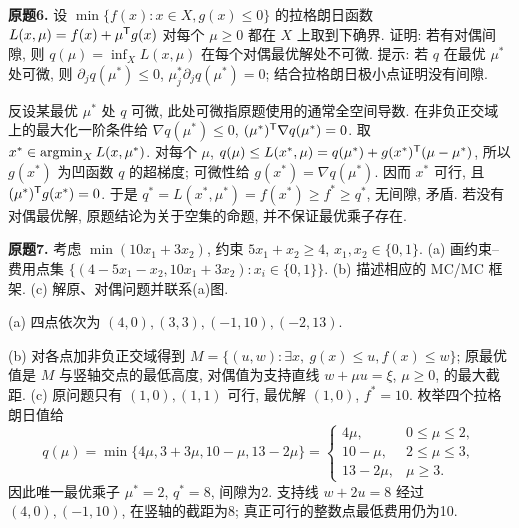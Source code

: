 \begin{exercise}\label{ass:6253-hw5-q6}
\textbf{原题6.} 设 $\min\{f(x):x\in X,g(x)\le0\}$ 的拉格朗日函数 $L(x,\mu)=f(x)+\mu^{\mathsf T} g(x)$ 对每个 $\mu\ge0$ 都在 $X$ 上取到下确界. 证明: 若有对偶间隙, 则 $q(\mu)=\inf_XL(x,\mu)$ 在每个对偶最优解处不可微. 提示: 若 $q$ 在最优 $\mu^*$ 处可微, 则 $\partial_jq(\mu^*)\le0$, $\mu_j^*\partial_jq(\mu^*)=0$; 结合拉格朗日极小点证明没有间隙.
\end{exercise}
\begin{solution}
反设某最优 $\mu^*$ 处 $q$ 可微, 此处可微指原题使用的通常全空间导数. 在非负正交域上的最大化一阶条件给 $\nabla q(\mu^*)\le0$, $(\mu^*)^{\mathsf T}\nabla q(\mu^*)=0$. 取 $x^*\in\operatorname{argmin}_XL(x,\mu^*)$. 对每个 $\mu$,
$q(\mu)\le L(x^*,\mu)=q(\mu^*)+g(x^*)^{\mathsf T}(\mu-\mu^*)$,
所以 $g(x^*)$ 为凹函数 $q$ 的超梯度; 可微性给 $g(x^*)=\nabla q(\mu^*)$. 因而 $x^*$ 可行, 且 $(\mu^*)^{\mathsf T} g(x^*)=0$. 于是 $q^*=L(x^*,\mu^*)=f(x^*)\ge f^*\ge q^*$, 无间隙, 矛盾. 若没有对偶最优解, 原题结论为关于空集的命题, 并不保证最优乘子存在.
\end{solution}

\begin{exercise}\label{ass:6253-hw5-q7}
\textbf{原题7.} 考虑 $\min(10x_1+3x_2)$, 约束 $5x_1+x_2\ge4$, $x_1,x_2\in\{0,1\}$.
(a) 画约束--费用点集 $\{(4-5x_1-x_2,10x_1+3x_2):x_i\in\{0,1\}\}$.
(b) 描述相应的 MC/MC 框架.
(c) 解原、对偶问题并联系(a)图.
\end{exercise}
\begin{solution}
(a) 四点依次为 $(4,0),(3,3),(-1,10),(-2,13)$.
\begin{center}
\end{center}
(b) 对各点加非负正交域得到 $M=\{(u,w):\exists x,\ g(x)\le u,f(x)\le w\}$; 原最优值是 $M$ 与竖轴交点的最低高度, 对偶值为支持直线 $w+\mu u=\xi$, $\mu\ge0$, 的最大截距.
(c) 原问题只有 $(1,0),(1,1)$ 可行, 最优解 $(1,0)$, $f^*=10$. 枚举四个拉格朗日值给
\[
q(\mu)=\min\{4\mu,3+3\mu,10-\mu,13-2\mu\}
=\begin{cases}4\mu,&0\le\mu\le2,\\10-\mu,&2\le\mu\le3,\\13-2\mu,&\mu\ge3.\end{cases}
\]
因此唯一最优乘子 $\mu^*=2$, $q^*=8$, 间隙为2. 支持线 $w+2u=8$ 经过 $(4,0),(-1,10)$, 在竖轴的截距为8; 真正可行的整数点最低费用仍为10.
\end{solution}
